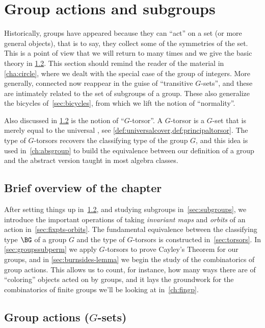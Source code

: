 \chapter{Group actions and subgroups}
\label{ch:actions}

Historically, groups have appeared because they can ``act'' on a set
(or more general objects), that is to say, they collect some of the
symmetries of the set. This is a point of view that we will return to
many times and we give the basic theory in \cref{sec:gsets}.
This section should remind the reader of the material in \cref{cha:circle},
where we dealt with the special case of the group of integers.
More generally, connected \coverings now reappear in the guise of
``transitive $G$-sets'', and these are intimately related to
the set of subgroups of a group.
These also generalize the bicycles of~\cref{sec:bicycles},
from which we lift the notion of ``normality''.

Also discussed in \cref{sec:gsets} is the notion of ``$G$-torsor''.
A $G$-torsor is a $G$-set that is merely equal to the universal \covering,
see \cref{def:universalcover,def:principaltorsor}.
The type of $G$-torsors recovers the classifying type of the group $G$,
and this idea is used in~\cref{ch:absgroup} to build the equivalence between
our definition of a group and the abstract version taught in most algebra
classes.

\section{Brief overview of the chapter}

After setting things up in~\cref{sec:gsets}, and
studying subgroups in~\cref{sec:subgroups},
we introduce the important
operations of taking \emph{invariant maps} and \emph{orbits} of an action
in~\cref{sec:fixpts-orbits}.
The fundamental equivalence between the classifying type $\BG$ of a group $G$
and the type of $G$-torsors is constructed in~\cref{sec:torsors}. 
In \cref{sec:groupssubperm} we apply $G$-torsors to prove Cayley's Theorem
for our groups, and in \cref{sec:burnsides-lemma} we
begin the study of the combinatorics of group actions.
This allows us to count, for instance, how many ways there are of 
``coloring'' objects acted on by groups,
and it lays the groundwork for the combinatorics of finite groups
we'll be looking at in~\cref{ch:fingp}.

\section{Group actions ($G$-sets)}
\label{sec:gsets}

